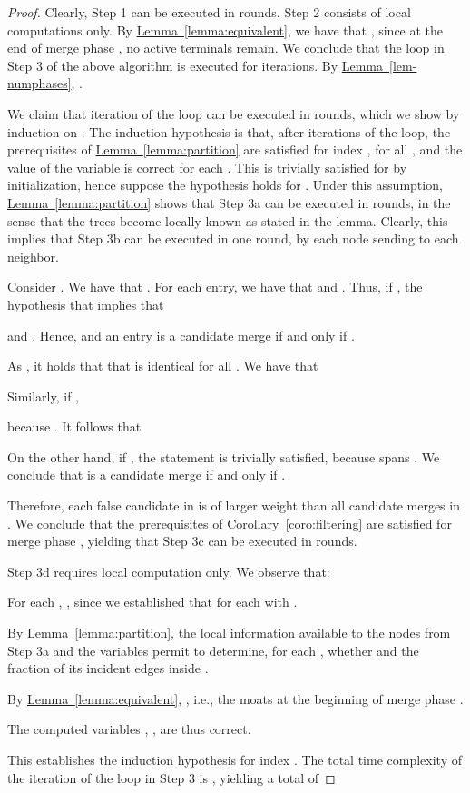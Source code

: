 \documentclass[letterpaper,11pt]{article}
\newcommand{\namedref}[2]{\hyperref[#2]{#1~\ref*{#2}}}
\newcommand{\lemmaref}[1]{\namedref{Lemma}{#1}}
\newcommand{\corollaryref}[1]{\namedref{Corollary}{#1}}
\begin{document}
\begin{proof}
Clearly, Step 1 can be executed in  rounds. Step 2 consists of local
computations only. By \lemmaref{lemma:equivalent}, we have that
, since at the end of merge phase , no active
terminals remain. We conclude that the loop in Step 3 of the above algorithm is
executed for  iterations. By \lemmaref{lem-numphases}, .

We claim that iteration  of the loop can be executed
in  rounds, which we show by induction on . The induction
hypothesis is that, after  iterations of the loop, the prerequisites of
\lemmaref{lemma:partition} are satisfied for index ,
 for all , and the value of the
variable  is correct for each . This is trivially satisfied
for  by initialization, hence suppose the hypothesis holds for
. Under this assumption, \lemmaref{lemma:partition}
shows that Step 3a can be executed in  rounds, in the sense that the
trees become locally known as stated in the lemma. Clearly, this implies that
Step 3b can be executed in one round, by each node  sending  to each
neighbor.

Consider . We have that
. For each entry, we have that  and . Thus,
if , the hypothesis that
 implies that

and . Hence,
 and an entry
 is a candidate merge if and only
if .

As , it holds that that
 is identical for all
. We have that

Similarly, if ,

because . It follows that

On the other hand, if , the statement  is trivially satisfied, because  spans
. We conclude that  is a candidate merge if and only if .

Therefore, each false candidate in  is of larger weight
than all candidate merges in . We conclude that the prerequisites of
\corollaryref{coro:filtering} are satisfied for merge phase , yielding that
Step 3c can be executed in  rounds.

Step 3d requires local computation only. We observe that:
\begin{compactitem}
\item For each , , since we established
that  for each  with .
\item By \lemmaref{lemma:partition}, the local information available to the
nodes from Step 3a and the  variables permit to determine, for each
, whether  and the fraction of its incident edges
inside .
\item By \lemmaref{lemma:equivalent}, , i.e., the moats
at the beginning of merge phase .
\item The computed variables , , are thus correct.
\end{compactitem}
This establishes the induction hypothesis for index . The total time
complexity of the  iteration of the loop in Step 3 is
, yielding a total of


\end{proof}
\end{document}
